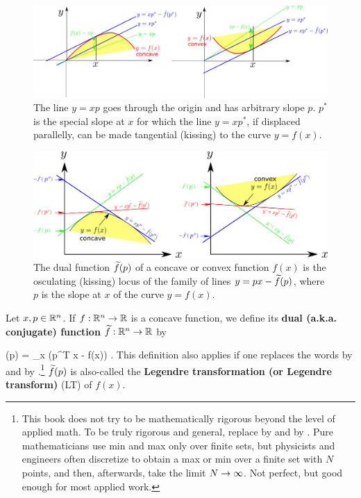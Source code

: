 \begin{figure}[h!]
\centering
\includegraphics[width=6in]
{conventions/dual-fun-detail.png}
\caption{The line
$y=xp$ goes through the
origin and has arbitrary slope
$p$. $p^*$ is
the special slope
at $x$
for which the line
$y=xp^*$,
if
displaced parallelly,
can be made tangential (kissing)
to
the curve $y=f(x)$.}
\label{fig-dual-fun-detail}
\end{figure}

\begin{figure}[h!]
\centering
\includegraphics[width=6in]
{conventions/dual-fun.png}
\caption{The dual
function ${\widetilde{f}}(p)$ of a concave or convex function
$f(x)$
is the osculating (kissing)
locus of the
family
of lines $y=px - {\widetilde{f}}(p)$,
where $p$
is the slope at $x$
of the curve $y=f(x)$.}
\label{fig-dual-fun}
\end{figure}

Let $x,p\in{ \mathbb{R}}^n$.
If $f:{ \mathbb{R}}^n\rightarrow { \mathbb{R}}$ is a concave function, we
define its {\bf dual (a.k.a.
conjugate) function}
${\widetilde{f}}:{ \mathbb{R}}^n\rightarrow { \mathbb{R}}$ by

\beq
{}(p) = \min_x (p^T x - f(x))
\label{eq-Fp-def}
\;.
\eeq
This definition also applies if
one replaces the words 
by  and
 by .\footnote{This
book does not try to be
mathematically rigorous
beyond the level
of applied math. To be truly
rigorous and general,
replace  by 
and  by .
Pure mathematicians use
min and max
only over finite sets,
but physicists and engineers
often discretize to obtain
a max or min  over a finite
set with $N$ points,
and then, afterwards,
take the limit $N\rightarrow\infty$.
Not perfect, but good enough
for most applied work. }
${\widetilde{f}}(p)$
is also-called the
{\bf Legendre transformation (or
Legendre transform)} (LT)
of $f(x)$.

